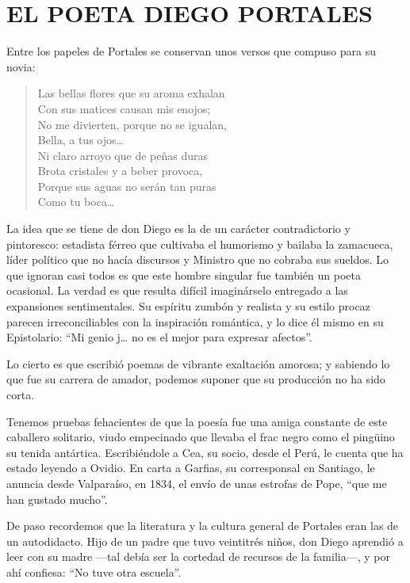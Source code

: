\documentclass[10pt,twoside,openright]{memoir}
\begin{document}
\chapter{EL POETA DIEGO PORTALES}

Entre los papeles de Portales se conservan unos versos que compuso para
su novia:

\begin{verse}
Las bellas flores que su aroma exhalan\\
Con sus matices causan mis enojos;\\
No me divierten, porque no se igualan,\\
Bella, a tus ojos\ldots\\
Ni claro arroyo que de peñas duras\\
Brota cristales y a beber provoca,\\
Porque sus aguas no serán tan puras\\
Como tu boca\ldots
\end{verse}

La idea que se tiene de don Diego es la de un carácter contradictorio y
pintoresco: estadista férreo que cultivaba el humorismo y bailaba la
zamacueca, líder político que no hacía discursos y Ministro que no
cobraba sus sueldos. Lo que ignoran casi todos es que este hombre
singular fue también un poeta ocasional. La verdad es que resulta
difícil imaginárselo entregado a las expansiones sentimentales. Su
espíritu zumbón y realista y su estilo procaz parecen irreconciliables
con la inspiración romántica, y lo dice él mismo en su Epistolario: ``Mi
genio j\ldots{} no es el mejor para expresar afectos''.

Lo cierto es que escribió poemas de vibrante exaltación amorosa; y
sabiendo lo que fue su carrera de amador, podemos suponer que su
producción no ha sido corta.

Tenemos pruebas fehacientes de que la poesía fue una amiga constante de
este caballero solitario, viudo empecinado que llevaba el frac negro
como el pingüino su tenida antártica. Escribiéndole a Cea, su socio,
desde el Perú, le cuenta que ha estado leyendo a Ovidio. En carta a
Garfias, su corresponsal en Santiago, le anuncia desde Valparaíso, en
1834, el envío de unas estrofas de Pope, ``que me han gustado mucho''.

De paso recordemos que la literatura y la cultura general de Portales
eran las de un autodidacto. Hijo de un padre que tuvo veintitrés niños,
don Diego aprendió a leer con su madre ---tal debía ser la cortedad de
recursos de la familia---, y por ahí confiesa: ``No tuve otra escuela''.
\end{document}
